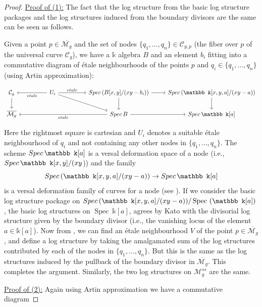 \documentclass[11pt]{amsart}
\DeclareMathOperator{\Spec}{Spec}
\theoremstyle{plain}
\numberwithin{equation}{section}
\newcommand{\spec}{{\rm Spec}\,}
\theoremstyle{definition}
\theoremstyle{plain}
\begin{document}
\begin{proof}
\underline{Proof of (1):}
The fact that the log structure from the basic log structure packages and the log structures induced from the boundary divisors are the same can be seen as follows.

Given a point $p\in \overline{\mathcal M_g}$ and the set of nodes $\{q_1, \dots, q_n\}\in \mathcal C_{g, p}$ (the fiber over $p$ of the universal curve $\mathcal C_{g}$), we have a $\mathbb{k}$ algebra $B$ and an element $b_i$ fitting into a commutative diagram of \'{e}tale neighbourhoods of the points $p$ and $q_i \in \{q_1, \dots, q_n\}$ (using Artin approximation):

\begin{equation}
\begin{tikzcd}
\mathcal C_g\arrow{d} && U_i \arrow{ll}{etale}\arrow{drr}\arrow{rr}{etale} && \spec (B[x,y]/(xy-b_i))\arrow{d} \arrow{r} &\spec (\mathbb k[x,y,a]/(xy-a)) \arrow{d}\\
\overline{\mathcal M_g} & & & & \spec B \arrow{llll}{etale} \arrow{r} & \spec \mathbb k[a] 
\end{tikzcd}
\end{equation}

Here the rightmost square is cartesian and $U_i$ denotes a suitable \'{e}tale neighbourhood of $q_i$ and not containing any other nodes in $\{q_1, \dots, q_n\}$. The scheme $\spec \mathbb k[a]$ is a versal deformation space of a node (i.e., $\spec \mathbb k[x,y]/(x y$)) and the family \[\spec (\mathbb k[x,y,a]/(xy-a))\to \spec \mathbb k[a]\] is a versal deformation family of curves for a node (see \cite[Theorem 14.1]{Hart}). If we consider the basic log structure package on $\spec (\mathbb k[x,y,a]/(xy-a)) / \Spec~(\mathbb k[a])$, the basic log structures on $\Spec~\mathbb k[a]$, agrees by Kato \cite[Lemma 4.4]{17} with the divisorial log structure given by the boundary divisor (i.e., the vanishing locus of the element $a\in \mathbb k[a]$). Now from \cite[Lemma 2.1, Lemma 2.2, Proposition 2.3]{17}, we can find an \'{e}tale neighbourhood $V$ of the point $p\in \overline{\mathcal M_g}$, and define a log structure by taking the amalgamated sum of the log structures contributed by each of the nodes in $\{q_1, \dots, q_n\}$.  But this is the same as the log structures induced by the pullback of the boundary divisor in $\overline{\mathcal M_g}$. This completes the argument. Similarly, the two log structures on $\mathcal M^{ss}_g$ are the same. 

\underline{Proof of (2):} Again using Artin approximation we have a commutative diagram 


\end{proof}
\end{document}
